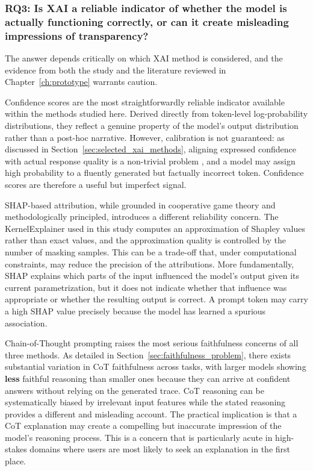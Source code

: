 \subsubsection*{RQ3: Is XAI a reliable indicator of whether the model is actually functioning correctly, or can it create misleading impressions of transparency?}

The answer depends critically on which XAI method is considered, and the evidence from both the study and the literature reviewed in Chapter~\ref{ch:prototype} warrants caution.

Confidence scores are the most straightforwardly reliable indicator available within the methods studied here. Derived directly from token-level log-probability distributions, they reflect a genuine property of the model's output distribution rather than a post-hoc narrative. However, calibration is not guaranteed: as discussed in Section~\ref{sec:selected_xai_methods}, aligning expressed confidence with actual response quality is a non-trivial problem \cite{tao_when_2024}, and a model may assign high probability to a fluently generated but factually incorrect token. Confidence scores are therefore a useful but imperfect signal.

SHAP-based attribution, while grounded in cooperative game theory and methodologically principled, introduces a different reliability concern. The KernelExplainer used in this study computes an approximation of Shapley values rather than exact values, and the approximation quality is controlled by the number of masking samples. This can be a trade-off that, under computational constraints, may reduce the precision of the attributions. More fundamentally, SHAP explains which parts of the input influenced the model's output given its current parametrization, but it does not indicate whether that influence was appropriate or whether the resulting output is correct. A prompt token may carry a high SHAP value precisely because the model has learned a spurious association.

Chain-of-Thought prompting raises the most serious faithfulness concerns of all three methods. As detailed in Section~\ref{sec:faithfulness_problem},  there exists substantial variation in CoT faithfulness across tasks, with larger models showing \textbf{less} faithful reasoning than smaller ones because they can arrive at confident answers without relying on the generated trace\cite{lanham_measuring_2023}. CoT reasoning can be systematically biased by irrelevant input features while the stated reasoning provides a different and misleading account\cite{turpin_language_2023}. The practical implication is that a CoT explanation may create a compelling but inaccurate impression of the model's reasoning process. This is a concern that is particularly acute in high-stakes domains where users are most likely to seek an explanation in the first place.

